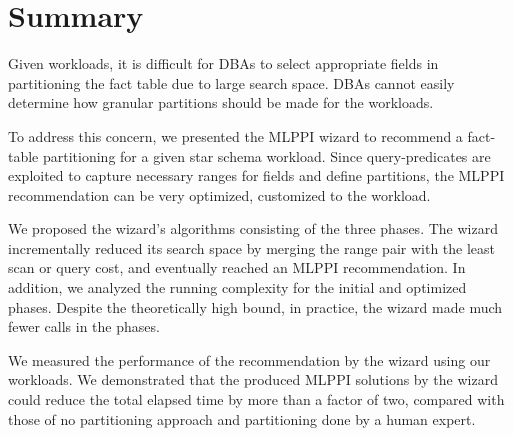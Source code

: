 \documentclass[runningheads]{comsis2}
\begin{document}
\section{Summary}
\label{sec:conclusion}

Given workloads, it is difficult for DBAs to select appropriate fields 
in partitioning the fact table due to large search space. 
DBAs cannot easily determine how granular partitions should be made 
for the workloads. 

To address this concern, we presented the MLPPI wizard to recommend a fact-table partitioning for a given star schema workload. 
Since \hbox{query-predicates} are exploited 
to capture necessary ranges for fields and define partitions, 
the MLPPI \hbox{recommendation} can be very optimized, customized to the workload.  

We proposed the wizard's algorithms consisting of the three phases. 
The wizard incrementally reduced its search space by merging 
the range pair with the least scan or query cost, and eventually reached an MLPPI recommendation. 
In addition, we analyzed the running complexity for the initial and optimized phases. 
Despite the theoretically high bound, in practice, the wizard made much fewer calls in the phases.

We measured the performance of the recommendation by the wizard using 
our workloads.  
We demonstrated that the produced MLPPI solutions by 
the wizard could reduce the total elapsed time by more than a factor of two, 
compared with those of no partitioning approach and partitioning 
done by a human expert. 


{\footnotesize


}
\end{document}
